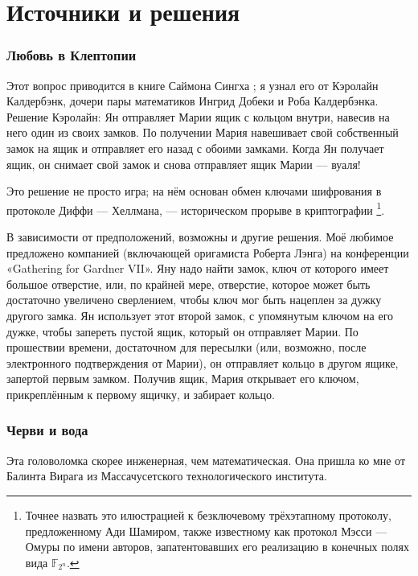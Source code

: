 \section*{Источники и решения}
\subsubsection*{Любовь в Клептопии}

Этот вопрос приводится в книге Саймона Сингха \cite{53};
я узнал его от Кэролайн Калдербэнк, дочери пары математиков Ингрид Добеки и Роба Калдербэнка.
Решение Кэролайн: Ян отправляет Марии ящик с кольцом внутри, навесив на него один из своих замков. По получении Мария навешивает свой собственный замок на ящик и отправляет его назад с обоими замками. Когда Ян получает ящик, он снимает свой замок и снова отправляет ящик Марии --- вуаля!

Это решение не просто игра;
на нём основан обмен ключами шифрования в протоколе Диффи — Хеллмана,
--- историческом прорыве в криптографии%
\footnote{Точнее назвать это илюстрацией к безключевому трёхэтапному протоколу, предложенному Ади Шамиром, также известному как протокол Мэсси --- Омуры по имени авторов, запатентовавших его реализацию в конечных полях вида $\mathbb{F}_{2^n}$. \pr}.

В зависимости от предположений, возможны и другие решения.
Моё любимое предложено компанией (включающей оригамиста Роберта Лэнга) на конференции «Ga\-the\-ring for Gardner VII».
Яну надо найти замок, ключ от которого имеет большое отверстие, или, по крайней мере, отверстие, которое может быть достаточно увеличено сверлением, чтобы ключ мог быть нацеплен за дужку другого замка.
Ян использует этот второй замок, с упомянутым ключом на его дужке, чтобы запереть пустой ящик, который он отправляет Марии.
По прошествии времени, достаточном для пересылки (или, возможно, после электронного подтверждения от Марии), он отправляет кольцо в другом ящике, запертой первым замком.
Получив ящик, Мария открывает его ключом, прикреплённым к первому ящичку, и забирает кольцо.


\subsubsection*{Черви и вода}

Эта головоломка скорее инженерная, чем математическая.
Она пришла ко мне от Балинта Вирага из Массачусетского технологического института.

